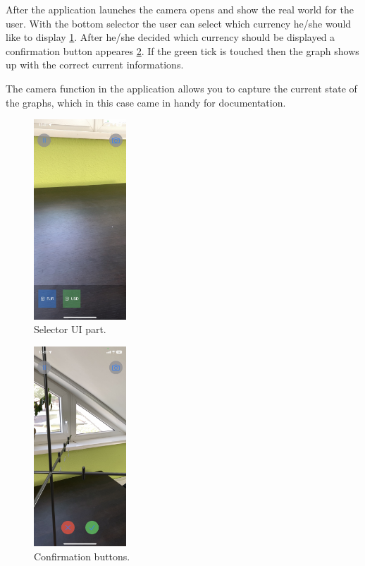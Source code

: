 \documentclass[a4paper,oneside]{article}
\begin{document}
After the application launches the camera opens and show the real world for the user.  With the bottom selector the user can select which currency he/she  would like to display \ref{fig:selector}.
After he/she decided which currency should be displayed a confirmation button appeares \ref{fig:megerosites}. If the green tick is touched then the graph shows up with the correct current informations.

The camera function in the application allows you to capture the current state of the graphs, which in this case came in handy for documentation.
\begin{figure}[!ht]
  \centering
  \includegraphics[height=75mm, keepaspectratio]{../images/selector.jpeg}
  \caption{Selector UI part.}
  \label{fig:selector}
\end{figure}

\begin{figure}[!ht]
  \centering
  \includegraphics[height=75mm, keepaspectratio]{../images/megerosites.jpeg}
  \caption{Confirmation buttons.}
  \label{fig:megerosites}
\end{figure}
\end{document}
